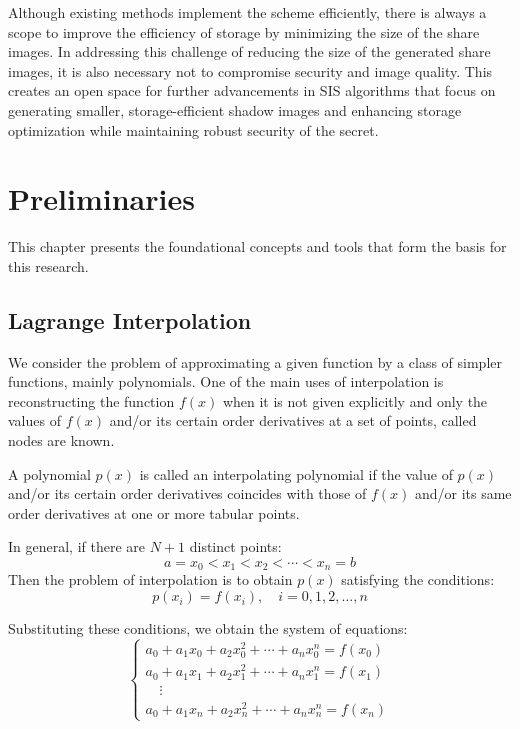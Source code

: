 Although existing methods implement the scheme efficiently, there is always a scope to improve the efficiency of storage by minimizing the size of the share images. In addressing this challenge of reducing the size of the generated share images, it is also necessary not to compromise security and image quality. This creates an open space for further advancements in SIS algorithms that focus on generating smaller, storage-efficient shadow images and enhancing storage optimization while maintaining robust security of the secret.
 
\section{Preliminaries}
 
This chapter presents the foundational concepts and tools that form the basis for this research.
 
\subsection{Lagrange Interpolation}
 
We consider the problem of approximating a given function by a class of simpler functions, mainly polynomials. One of the main uses of interpolation is reconstructing the function $f(x)$ when it is not given explicitly and only the values of $f(x)$ and/or its certain order derivatives at a set of points, called nodes are known.
 
A polynomial $p(x)$ is called an interpolating polynomial if the value of $p(x)$ and/or its certain order derivatives coincides with those of $f(x)$ and/or its same order derivatives at one or more tabular points.
 
In general, if there are $N + 1$ distinct points:
\begin{equation}
a = x_0 < x_1 < x_2 < \cdots < x_n = b
\end{equation}
Then the problem of interpolation is to obtain $p(x)$ satisfying the conditions:
\begin{equation}
    p(x_i) = f(x_i), \quad i = 0, 1, 2, \ldots, n
\end{equation}
 
Substituting these conditions, we obtain the system of equations:
\begin{equation}
\begin{cases}
a_0 + a_1 x_0 + a_2 x_0^2 + \cdots + a_n x_0^n = f(x_0) \\
a_0 + a_1 x_1 + a_2 x_1^2 + \cdots + a_n x_1^n = f(x_1) \\
\quad \vdots \\
a_0 + a_1 x_n + a_2 x_n^2 + \cdots + a_n x_n^n = f(x_n)
\end{cases}
\end{equation}
 
